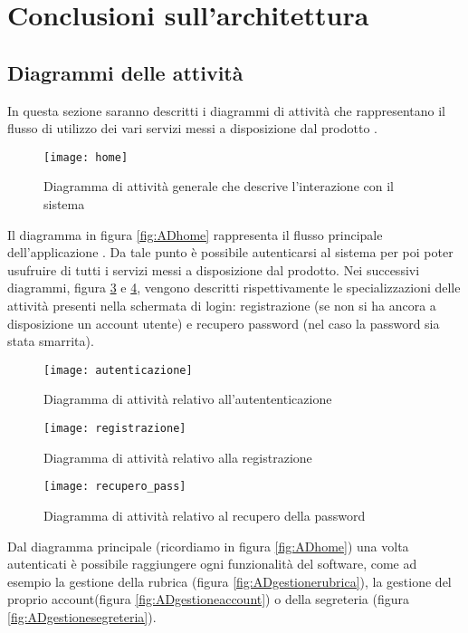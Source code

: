 \section{Conclusioni sull'architettura}

\subsection{Diagrammi delle attività}
In questa sezione saranno descritti i diagrammi di attività che rappresentano il flusso di utilizzo dei vari servizi messi a disposizione dal prodotto \caName.

\begin{figure}[H]
\centering
\texttt{[image: home]}
\caption{Diagramma di attività generale che descrive l'interazione con il sistema}\label{fig:ADhome}
\end{figure}

Il diagramma in figura \vref{fig:ADhome} rappresenta il flusso principale dell'applicazione \caName. Da tale punto è possibile autenticarsi al sistema per poi poter usufruire di tutti i servizi messi a disposizione dal prodotto. Nei successivi diagrammi, figura \ref{fig:ADregistrazione} e \ref{fig:ADrecuperopassword}, vengono descritti rispettivamente le specializzazioni delle attività presenti nella schermata di login: registrazione (se non si ha ancora a disposizione un account utente) e recupero password (nel caso la password sia stata smarrita).

\begin{figure}[H]
\centering
\texttt{[image: autenticazione]}
\caption{Diagramma di attività relativo all'autententicazione}\label{fig:ADautenticazione}
\end{figure}

\begin{figure}[H]
\centering
\texttt{[image: registrazione]}
\caption{Diagramma di attività relativo alla registrazione}\label{fig:ADregistrazione}
\end{figure}

\begin{figure}[H]
\centering
\texttt{[image: recupero\_pass]}
\caption{Diagramma di attività relativo al recupero della password}\label{fig:ADrecuperopassword}
\end{figure}


Dal diagramma principale (ricordiamo in figura \vref{fig:ADhome}) una volta autenticati è possibile raggiungere ogni funzionalità del software, come ad esempio la gestione della rubrica (figura \ref{fig:ADgestionerubrica}), la gestione del proprio account(figura \ref{fig:ADgestioneaccount}) o della segreteria (figura \ref{fig:ADgestionesegreteria}).

